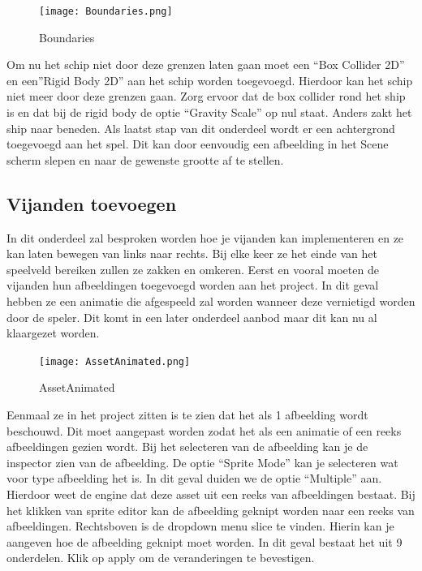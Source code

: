 \begin{figure}[H]
    \centering
    \texttt{[image: Boundaries.png]}
    \caption{Boundaries}
    \label{fig:Boundaries}
\end{figure}

Om nu het schip niet door deze grenzen laten gaan moet een “Box Collider 2D” en een”Rigid Body 2D” aan het schip worden toegevoegd. Hierdoor kan het schip niet meer door deze grenzen gaan. Zorg ervoor dat de box collider rond het ship is en dat bij de rigid body de optie “Gravity Scale” op nul staat. Anders zakt het ship naar beneden.
Als laatst stap van dit onderdeel wordt er een achtergrond toegevoegd aan het spel. Dit kan door eenvoudig een afbeelding in het Scene scherm slepen en naar de gewenste grootte af te stellen.

\subsection{Vijanden toevoegen}
In dit onderdeel zal besproken worden hoe je vijanden kan implementeren en ze kan laten bewegen van links naar rechts. Bij elke keer ze het einde van het speelveld bereiken zullen ze zakken en omkeren.
Eerst en vooral moeten de vijanden hun afbeeldingen toegevoegd worden aan het project. In dit geval hebben ze een animatie die afgespeeld zal worden wanneer deze vernietigd worden door de speler. Dit komt in een later onderdeel aanbod maar dit kan nu al klaargezet worden.

\begin{figure}[H]
    \centering
    \texttt{[image: AssetAnimated.png]}
    \caption{AssetAnimated}
    \label{fig:AssetAnimated}
\end{figure}

Eenmaal ze in het project zitten is te zien dat het als 1 afbeelding wordt beschouwd. Dit moet aangepast worden zodat het als een animatie of een reeks afbeeldingen gezien wordt. Bij het selecteren van de afbeelding kan je de inspector zien van de afbeelding. De optie “Sprite Mode” kan je selecteren wat voor type afbeelding het is. In dit geval duiden we de optie “Multiple” aan. Hierdoor weet de engine dat deze asset uit een reeks van afbeeldingen bestaat. Bij het klikken van sprite editor kan de afbeelding geknipt worden naar een reeks van afbeeldingen. Rechtsboven is de dropdown menu slice te vinden. Hierin kan je aangeven hoe de afbeelding geknipt moet worden. In dit geval bestaat het uit 9 onderdelen. Klik op apply om de veranderingen te bevestigen.


